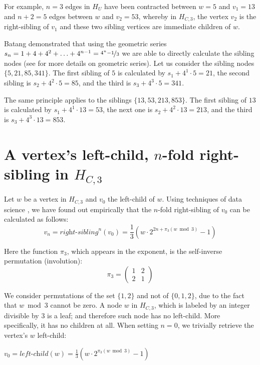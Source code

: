 For example, $n=3$ edges in $H_U$ have been contracted between $w=5$ and $v_1=13$ and $n+2=5$ edges between $w$ and $v_2=53$, whereby in $H_{C,3}$, the vertex $v_2$ is the right-sibling of $v_1$ and these two sibling vertices are immediate children of $w$.

Batang \cite{Ref_Batang} demonstrated that using the geometric series $s_n=1+4+4^2+\ldots+4^{n-1}=\nicefrac{4^n-1}{3}$ we are able to directly calculate the sibling nodes (see \cite[p.~191-192]{Ref_Teschl_2013} for more details on geometric series). Let us consider the sibling nodes $\{5,21,85,341\}$. The first sibling of $5$ is calculated by $s_1+4^1\cdot5=21$, the second sibling is $s_2+4^2\cdot5=85$, and the third is $s_3+4^3\cdot5=341$.

The same principle applies to the siblings $\{13,53,213,853\}$. The first sibling of $13$ is calculated by $s_1+4^1\cdot13=53$, the next one is $s_2+4^2\cdot13=213$, and the third is $s_3+4^3\cdot13=853$.

\section{\texorpdfstring{A vertex's left-child, $n$-fold right-sibling in $H_{C,3}$}{A vertex's left-child, n-fold right-sibling in HC3}}
\label{sec:left_child_right_sibling_3}

Let $w$ be a vertex in $H_{C,3}$ and $v_0$ the left-child of $w$. Using techniques of data science \cite{Ref_Koch_Github}, we have found out empirically that the $n$-fold right-sibling of $v_0$ can be calculated as follows:
\begin{equation}
\label{eq:nfold_right_sibling_3}
	v_n=\textit{right-sibling}^n(v_0)=\frac{1}{3}\left(w\cdot2^{2n+\pi_3(w\bmod 3)}-1\right)
\end{equation}

Here the function $\pi_3$, which appears in the exponent, is the self-inverse permutation (involution):
\begin{equation}
\label{eq:pi_3}
	\pi_3=\left(\begin{array}{cc}
	1 & 2\\
	2 & 1
	\end{array}\right)
\end{equation}

We consider permutations of the set $\{1,2\}$ and not of $\{0,1,2\}$, due to the fact that $w\bmod 3$ cannot be zero. A node $w$ in $H_{C,3}$, which is labeled by an integer divisible by $3$ is a leaf; and therefore such node has no left-child. More specifically, it has no children at all. When setting $n=0$, we trivially retrieve the vertex's $w$ left-child:
\begin{center}
	$v_0=\textit{left-child}(w)=\frac{1}{3}\left(w\cdot2^{\pi_3(w\bmod 3)}-1\right)$
\end{center}

